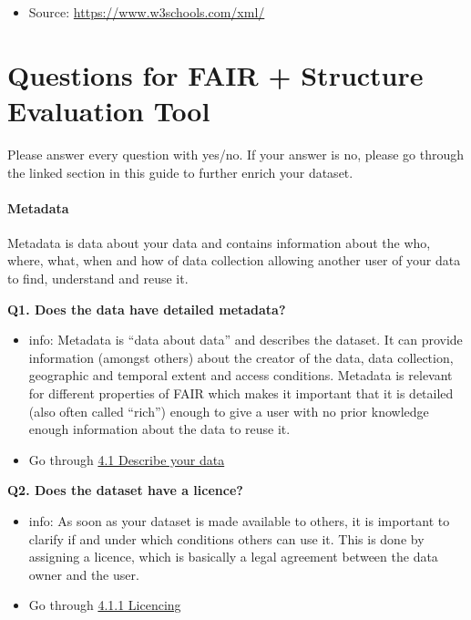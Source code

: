 \documentclass[
]{book}
\providecommand{\tightlist}{%
  \setlength{\itemsep}{0pt}\setlength{\parskip}{0pt}}
\begin{document}
\begin{itemize}
\tightlist
\item
  Source: \url{https://www.w3schools.com/xml/}
\end{itemize}

\hypertarget{questions-tool}{%
\chapter{Questions for FAIR + Structure Evaluation Tool}\label{questions-tool}}

Please answer every question with yes/no. If your answer is no, please go through the linked section in this guide to further enrich your dataset.

\hypertarget{metadata-1}{%
\subsubsection*{Metadata}\label{metadata-1}}

Metadata is data about your data and contains information about the who, where, what, when and how of data collection allowing another user of your data to find, understand and reuse it.

\textbf{Q1. Does the data have detailed metadata?}

\begin{itemize}
\tightlist
\item
  info: Metadata is ``data about data'' and describes the dataset. It can provide information (amongst others) about the creator of the data, data collection, geographic and temporal extent and access conditions. Metadata is relevant for different properties of FAIR which makes it important that it is detailed (also often called ``rich'') enough to give a user with no prior knowledge enough information about the data to reuse it.\\
\item
  Go through \protect\hyperlink{describe-data}{4.1 Describe your data}
\end{itemize}

\textbf{Q2. Does the dataset have a licence?}

\begin{itemize}
\tightlist
\item
  info: As soon as your dataset is made available to others, it is important to clarify if and under which conditions others can use it. This is done by assigning a licence, which is basically a legal agreement between the data owner and the user.
\item
  Go through \protect\hyperlink{licencing}{4.1.1 Licencing}
\end{itemize}
\end{document}
